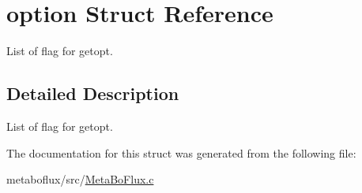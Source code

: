 \hypertarget{structoption}{
\section{option Struct Reference}
\label{structoption}
}


List of flag for getopt.  




\subsection{Detailed Description}
List of flag for getopt. 

The documentation for this struct was generated from the following file:\begin{DoxyCompactItemize}
\item 
metaboflux/src/\hyperlink{MetaBoFlux_8c}{MetaBoFlux.c}\end{DoxyCompactItemize}
